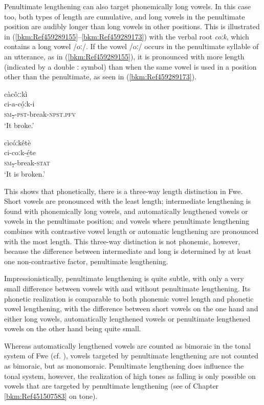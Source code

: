 Penultimate lengthening can also target phonemically long vowels. In this case too, both types of length are cumulative, and long vowels in the penultimate position are audibly longer than long vowels in other positions. This is illustrated in (\ref{bkm:Ref459289155}--\ref{bkm:Ref459289173}) with the verbal root \textit{coːk}, which contains a long vowel /oː/. If the vowel /oː/ occurs in the penultimate syllable of an utterance, as in (\ref{bkm:Ref459289155}), it is pronounced with more length (indicated by a double ː symbol) than when the same vowel is used in a position other than the penultimate, as seen in (\ref{bkm:Ref459289173}).

\ea
\label{bkm:Ref459289155}
\glll càcôːːkì\\
ci-a-có̲ːk-i\\
\textsc{sm}\textsubscript{7}-\textsc{pst}-break-\textsc{npst}.\textsc{pfv}\\
\glt ‘It broke.’
\z

\ea
\label{bkm:Ref459289173}
\glll cìcóːkêtè\\
ci-coːk-é̲te\\
\textsc{sm}\textsubscript{7}-break-\textsc{stat}\\
\glt ‘It is broken.’
\z

This shows that phonetically, there is a three-way length distinction in Fwe. Short vowels are pronounced with the least length; intermediate lengthening is found with phonemi\-cally long vowels, and automatically lengthened vowels or vowels in the penultimate position; and vow\-els where penultimate lengthening combines with contrastive vowel length or automatic lengthening are pronounced with the most length. This three-way distinction is not phonemic, however, because the difference between intermediate and long is determined by at least one non-contrastive factor, penultimate lengthening.

Impressionistically, penultimate lengthening is quite subtle, with only a very small difference between vowels with and without penultimate lengthening. Its phonetic realization is comparable to both phonemic vowel length and phonetic vowel lengthening, with the difference between short vo\-wels on the one hand and either long vowels, automatically lengthened vowels or penultimate lengthened vowels on the other hand being quite small.

Whereas automatically lengthened vowels are counted as bimoraic in the tonal system of Fwe (cf. ), vowels targeted by penultimate lengthening are not counted as bimoraic, but as monomoraic. Penultimate lengthening does influence the tonal system, however, the realization of high tones as falling is only possible on vowels that are targeted by penultimate lengthening (see  of Chapter \ref{bkm:Ref451507583} on tone).

